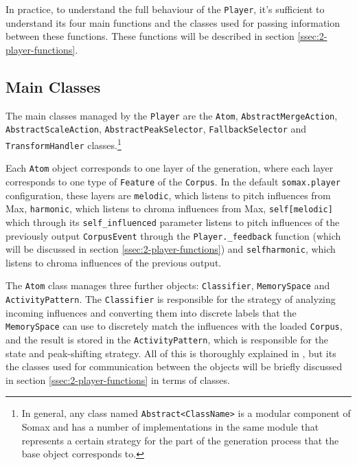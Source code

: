 In practice, to understand the full behaviour of the \texttt{Player}, it's sufficient to understand its four main functions and the classes used for passing information between these functions. These functions will be described in section \ref{ssec:2-player-functions}.



\subsection{Main Classes}\label{ssec:2-player-classes}

The main classes managed by the \texttt{Player} are the \texttt{Atom}, \texttt{AbstractMergeAction}, \\\texttt{AbstractScaleAction}, \texttt{AbstractPeakSelector}, \texttt{FallbackSelector} and \\ \texttt{TransformHandler} classes.\footnote{In general, any class named \texttt{Abstract<ClassName>} is a modular component of Somax and has a number of implementations in the same module that represents a certain strategy for the part of the generation process that the base object corresponds to.}

Each \texttt{Atom} object corresponds to one layer of the generation, where each layer corresponds to one type of \texttt{Feature} of the \texttt{Corpus}. In the default \texttt{somax.player} configuration, these layers are \texttt{melodic}, which listens to pitch influences from Max, \texttt{harmonic}, which listens to chroma influences from Max, \texttt{self[melodic]} which through its \texttt{self\_influenced} parameter listens to pitch influences of the previously output \texttt{CorpusEvent} through the \texttt{Player.\_feedback} function (which will be discussed in section \ref{ssec:2-player-functions})  and \texttt{selfharmonic}, which listens to chroma influences of the previous output.

The \texttt{Atom} class manages three further objects: \texttt{Classifier}, \texttt{MemorySpace} and \texttt{ActivityPattern}. The \texttt{Classifier} is responsible for the strategy of analyzing incoming influences and converting them into discrete labels that the \texttt{MemorySpace} can use to discretely match the influences with the loaded \texttt{Corpus}, and the result is stored in the \texttt{ActivityPattern}, which is responsible for the state and peak-shifting strategy. All of this is thoroughly explained in \cite{somaxtheory2021}, but its the classes used for communication between the objects will be briefly discussed in section \ref{ssec:2-player-functions} in terms of classes.


